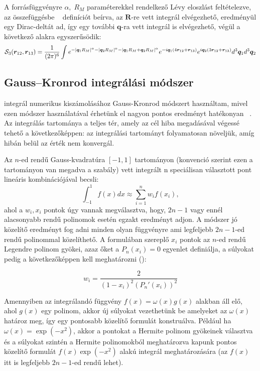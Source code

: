 \documentclass[11pt,a4paper]{article}
\numberwithin{equation}{subsection}
\numberwithin{figure}{section}
\begin{document}
A forrásfüggvényre $\alpha,\;R_M$ paraméterekkel rendelkező Lévy eloszlást feltételezve, az összefüggésbe ~ definíciót beírva, az $\bm{R}$-re vett integrál elvégezhető, eredményül egy Dirac-deltát ad, így egy további $\bm{q}$-ra vett integrál is elvégezhető, végül a következő alakra egyszerűsödik: 
\begin{equation}
\mathcal{S}_3(\bm{r}_{12}, \bm{r}_{13}) = \frac{1}{(2\pi)^6}
\int
e^{-\abs{\bm{q}_1R_M}^\alpha-\abs{\bm{q}_2R_M}^\alpha-\abs{\bm{q}_1R_M+\bm{q}_2R_M}^\alpha}
e^{-i\bm{q}_1(4\bm{r}_{12}+\bm{r}_{13})}
e^{i\bm{q}_2(3\bm{r}_{12}+\bm{r}_{13})}
d^3\bm{q}_1d^3\bm{q}_2
\label{eq:S3}
\end{equation}


\subsection{Gauss–Kronrod integrálási módszer}\label{sec:GK}

 integrál numerikus kiszámolásához Gauss-Kronrod módszert használtam, mivel ezen módszer használatával érhetünk el nagyon pontos eredményt hatékonyan  ~\cite{LevyEff}. Az integrálás tartománya a teljes tér, amely az cél hiba megadásával végessé tehető a következőképpen: az integrálási tartományt folyamatosan növeljük, amíg hibán belül az érték nem konvergál. 

Az $n$-ed rendű Gauss-kvadratúra $[-1,1]$ tartományon (konvenció szerint ezen a tartományon van megadva a szabály) vett integrált n speciálisan választott pont lineáris kombinációjával becsli:
\begin{equation}
\int_{-1}^1 f(x)dx\approx \sum_{i=1}^n w_if(x_i),
\end{equation}
ahol a $w_i, x_i$ pontok úgy vannak megválasztva, hogy, $2n-1$ vagy ennél alacsonyabb rendű polinomok esetén egzakt eredményt adjon. A módszer jó közelítő eredményt fog adni minden olyan függvényre ami legfeljebb $2n-1$-ed rendű polinommal közelíthető. A formulában szereplő $x_i$ pontok az $n$-ed rendű Legendre polinom gyökei, azaz őket a $P_n(x_i)=0$ egyenlet definiálja, a súlyokat pedig a következőképpen kell meghatározni (\cite{LGQ}):

\begin{equation}
w_i=\frac{2}{(1-x_i)^2(P_n'(x_i))^2}
\end{equation}

Amennyiben az integrálandó függvény $f(x)=\omega(x)g(x)$ alakban áll elő, ahol $g(x)$ egy polinom, akkor új súlyokat vezethetünk be amelyeket az $\omega(x)$ határoz meg, így egy pontosabb közelítő formulát konstruálva. Például ha $\omega(x)=\exp(-x^2)$, akkor a pontokat a Hermite polinom gyökeinek választva és a súlyokat szintén a Hermite polinomokból meghatározva kapunk pontos közelítő formulát $f(x)\exp(-x^2)$ alakú integrál meghatározására (az $f(x)$ itt is legfeljebb $2n-1$-ed rendű lehet).
\end{document}
